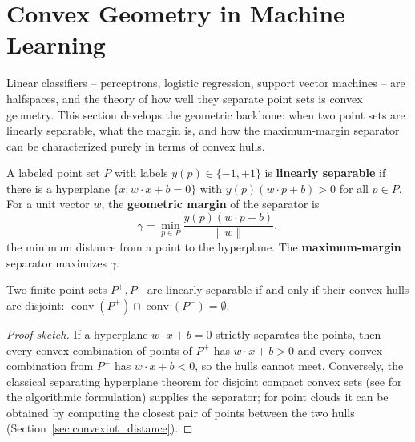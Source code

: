 
\section{Convex Geometry in Machine Learning}
\label{sec:data_ml_convex}

Linear classifiers -- perceptrons, logistic regression, support vector
machines -- are halfspaces, and the theory of how well they separate point
sets is convex geometry. This section develops the geometric backbone: when
two point sets are linearly separable, what the margin is, and how the
maximum-margin separator can be characterized purely in terms of convex
hulls.

\begin{definition}\label{def:data_ml_separability}
  A labeled point set $P$ with labels $y(p) \in \{-1, +1\}$ is
  \textbf{linearly separable} if there is a
  hyperplane $\{x : w \cdot x + b = 0\}$ with
  $y(p)(w \cdot p + b) > 0$ for all $p \in P$. For a unit vector $w$, the
  \textbf{geometric margin} of the separator is
  \[
    \gamma = \min_{p \in P} \frac{y(p)(w \cdot p + b)}{\|w\|},
  \]
  the minimum distance from a point to the hyperplane. The
  \textbf{maximum-margin} separator maximizes $\gamma$.
\end{definition}

\begin{theorem}\label{thm:data_ml_separating}
  Two finite point sets $P^+, P^-$ are linearly separable if and only if
  their convex hulls are disjoint: $\operatorname{conv}(P^+) \cap
  \operatorname{conv}(P^-) = \emptyset$.
\end{theorem}

\begin{proof}[Proof sketch]
  If a hyperplane $w \cdot x + b = 0$ strictly separates the points, then
  every convex combination of points of $P^+$ has $w \cdot x + b > 0$ and
  every convex combination from $P^-$ has $w \cdot x + b < 0$, so the hulls
  cannot meet. Conversely, the classical separating hyperplane theorem for
  disjoint compact convex sets (see \cite{cormen2009} for the algorithmic
  formulation) supplies the separator; for point clouds it can be obtained
  by computing the closest pair of points between the two hulls
  (Section~\ref{sec:convexint_distance}).
\end{proof}


